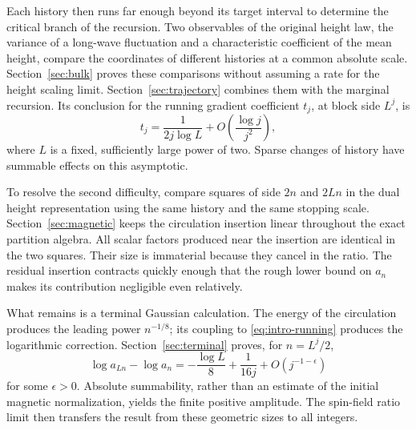 Each history then runs far enough beyond its target interval to determine
the critical branch of the recursion. Two observables of the original
height law, the variance of a long-wave fluctuation and a characteristic
coefficient of the mean height, compare the coordinates of different
histories at a common absolute scale. Section~\ref{sec:bulk} proves
these comparisons without assuming
a rate for the height scaling limit. Section~\ref{sec:trajectory} combines
them with the marginal recursion. Its conclusion for the running
gradient coefficient \(t_j\), at block side \(L^j\), is
\begin{equation}\label{eq:intro-running}
 t_j=\frac{1}{2j\log L}
                 +O\!\left(\frac{\log j}{j^2}\right),
\end{equation}
where \(L\) is a fixed, sufficiently large power of two. Sparse changes
of history have summable effects on this asymptotic.

To resolve the second difficulty, compare squares of side \(2n\) and
\(2Ln\) in the dual height representation using the same history and
the same stopping scale. Section~\ref{sec:magnetic} keeps the
circulation insertion linear throughout the exact partition algebra.
All scalar factors produced near the insertion are identical in the two
squares. Their size is immaterial because they cancel in the ratio.
The residual insertion contracts quickly enough that the rough lower
bound on \(a_n\) makes its contribution negligible even relatively.

What remains is a terminal Gaussian calculation. The energy of the
circulation produces the leading power \(n^{-1/8}\); its coupling to
\eqref{eq:intro-running} produces the logarithmic correction.
Section~\ref{sec:terminal} proves, for \(n=L^j/2\),
\begin{equation}\label{eq:intro-ratio}
 \log a_{Ln}-\log a_n
  =-\frac{\log L}{8}+\frac{1}{16j}
                  +O(j^{-1-\epsilon})
\end{equation}
for some \(\epsilon>0\). Absolute summability, rather than an estimate
of the initial magnetic normalization, yields the finite positive
amplitude. The spin-field ratio limit then transfers the result from
these geometric sizes to all integers.
